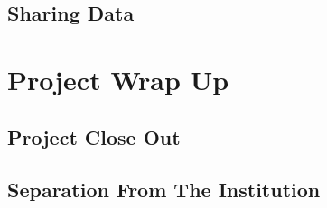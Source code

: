 \documentclass[
]{book}
\begin{document}
\hypertarget{sharing-data}{%
\section{Sharing Data}\label{sharing-data}}

\hypertarget{project-wrap-up}{%
\chapter{Project Wrap Up}\label{project-wrap-up}}

\hypertarget{project-close-out}{%
\section{Project Close Out}\label{project-close-out}}

\hypertarget{separation-from-the-institution}{%
\section{Separation From The Institution}\label{separation-from-the-institution}}

  
\end{document}
